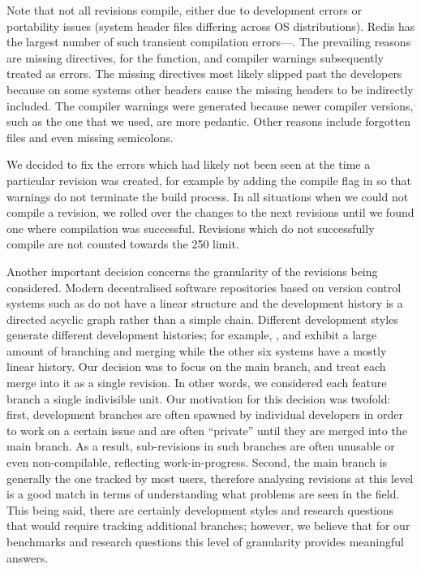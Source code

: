 Note that not all revisions compile, either due to development errors
or portability issues (\eg system header files differing across OS
distributions).
Redis has the largest number of such transient compilation
errors---\redisTransientCompErrs.  The prevailing reasons are missing
 directives, \eg {} for the  function,
and compiler warnings subsequently treated as errors.  The missing
 directives most likely slipped past the developers because on
some systems other  headers cause the missing headers to be
indirectly included. The compiler warnings were generated because newer
compiler versions, such as the one that we used, are more pedantic.  Other
reasons include forgotten files and even missing semicolons.

We decided to fix the errors which had likely not been seen at the time a
particular revision was created, for example by adding the compile flag
 in \binutils so that warnings do not terminate the build
process. In all situations when we could not compile a revision, we rolled over
the changes to the next revisions until we found one where compilation was
successful.  Revisions which do not successfully compile are not counted
towards the 250 limit.

Another important decision concerns the granularity of the revisions
being considered.  Modern decentralised software repositories based on
version control systems such as \git do not have a linear structure
and the development history is a directed acyclic graph rather than a
simple chain.  Different development styles generate different
development histories; for example, \git, \redis and \zeromq exhibit a
large amount of branching and merging while the other six systems
have a mostly linear history.  Our decision was to focus on the main branch,
and treat each merge into it as a single revision. In other words, we
considered each feature branch a single indivisible unit.  Our
motivation for this decision was twofold: first, development branches
are often spawned by individual developers in order to work on a
certain issue and are often ``private'' until they are merged into the
main branch.  As a result, sub-revisions in such branches are often
unusable or even non-compilable, reflecting work-in-progress.  Second,
the main branch is generally the one tracked by most users, therefore
analysing revisions at this level is a good match in terms of
understanding what problems are seen in the field.  This being said,
there are certainly development styles and research questions that would
require tracking additional branches; however, we believe that for our
benchmarks and research questions this level of granularity provides meaningful
answers.

